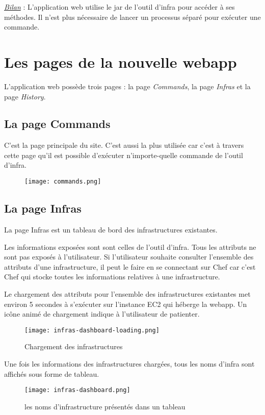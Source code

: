 \underline{\textit{Bilan}} : L'application web utilise le jar de l'outil d'infra
pour accéder à ses méthodes. Il n'est plus nécessaire de lancer un processus
séparé pour exécuter une commande.

\section{Les pages de la nouvelle webapp}
L'application web possède trois pages :
la page \textit{Commands}, la page \textit{Infras} et la page \textit{History}.

\subsection{La page Commands}

C'est la page principale du site. C'est aussi la plus utilisée car c'est à
travers cette page qu'il est possible d'exécuter n'importe-quelle commande de
l'outil d'infra. 

\begin{figure}[H]
  \texttt{[image: commands.png]}  
\end{figure}

\subsection{La page Infras}

La page Infras est un tableau de bord des infrastructures existantes.

Les informations exposées sont sont celles de l'outil d'infra. Tous les
attributs ne sont pas exposés à l'utilisateur. Si l'utilisateur souhaite
consulter l'ensemble des attributs d'une infrastructure, il peut le faire en se
connectant sur Chef car c'est Chef qui stocke toutes les informations relatives
à une infrastructure.

Le chargement des attributs pour l'ensemble des infrastructures existantes met
environ 5 secondes à s'exécuter sur l'instance EC2 qui héberge la webapp.
Un icône animé de chargement indique à l'utilisateur de patienter.

\begin{figure}[H]
  \texttt{[image: infras-dashboard-loading.png]}  
  \caption{Chargement des infrastructures}
\end{figure}

Une fois les informations des infrastructures chargées, tous les noms d'infra
sont affichés sous forme de tableau.
\begin{figure}[H]
  \texttt{[image: infras-dashboard.png]}  
  \caption{les noms d'infrastructure présentés dans un tableau}
\end{figure}

